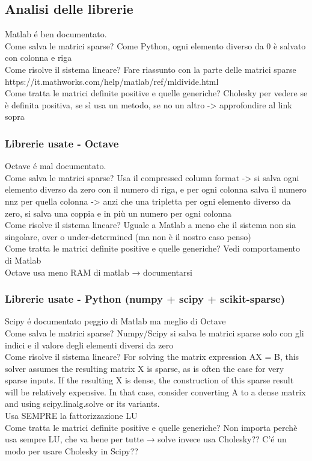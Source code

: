 \documentclass{beamer}
\begin{document}
\subsection{Analisi delle librerie}

\begin{frame}
Matlab \'e ben documentato.\\
Come salva le matrici sparse? Come Python, ogni elemento diverso da 0 è salvato con colonna e riga\\
Come risolve il sistema lineare? Fare riassunto con la parte delle matrici sparse https://it.mathworks.com/help/matlab/ref/mldivide.html\\
Come tratta le matrici definite positive e quelle generiche? Cholesky per vedere se è definita positiva, se sì usa un metodo, se no un altro -> approfondire al link sopra
\end{frame}


\begin{frame}
\frametitle{Librerie usate - Octave}
Octave \'e mal documentato. \\
Come salva le matrici sparse? Usa il compressed column format -> si salva ogni elemento diverso da zero con il numero di riga, e per ogni colonna salva il numero nnz per quella colonna -> anzi che una tripletta per ogni elemento diverso da zero, si salva una coppia e in più un numero per ogni colonna\\
Come risolve il sistema lineare? Uguale a Matlab a meno che il sistema non sia singolare, over o under-determined (ma non è il nostro caso penso)\\
Come tratta le matrici definite positive e quelle generiche? Vedi comportamento di Matlab\\

Octave usa meno RAM di matlab → documentarsi
\end{frame}

\begin{frame}
\frametitle{Librerie usate - Python (numpy + scipy + scikit-sparse)}
Scipy \'e documentato peggio di Matlab ma meglio di Octave \\
Come salva le matrici sparse? Numpy/Scipy si salva le matrici sparse solo con gli indici e il valore degli elementi diversi da zero\\
Come risolve il sistema lineare?
For solving the matrix expression AX = B, this solver assumes the resulting matrix X is sparse, as is often the case for very sparse inputs. If the resulting X is dense, the construction of this sparse result will be relatively expensive. In that case, consider converting A to a dense matrix and using scipy.linalg.solve or its variants.\\
Usa SEMPRE la fattorizzazione LU\\
Come tratta le matrici definite positive e quelle generiche? Non importa perchè usa sempre LU, che va bene per tutte → solve invece usa Cholesky?? C’\'e un modo per usare Cholesky in Scipy??
\end{frame}
\end{document}
